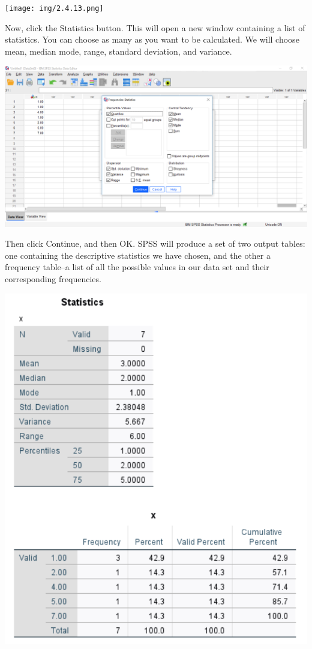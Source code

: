 \documentclass[]{book}
\begin{document}
\texttt{[image: img/2.4.13.png]}

Now, click the {Statistics} button. This will open a new window
containing a list of statistics. You can choose as many as you want to
be calculated. We will choose {mean, median mode, range, standard
deviation, and variance}.

\includegraphics{img/2.4.14.png}

Then click {Continue}, and then {OK}. SPSS will produce a set of two
output tables: one containing the descriptive statistics we have chosen,
and the other a frequency table--a list of all the possible values in
our data set and their corresponding frequencies.

\includegraphics{img/2.4.15.png}
\end{document}
